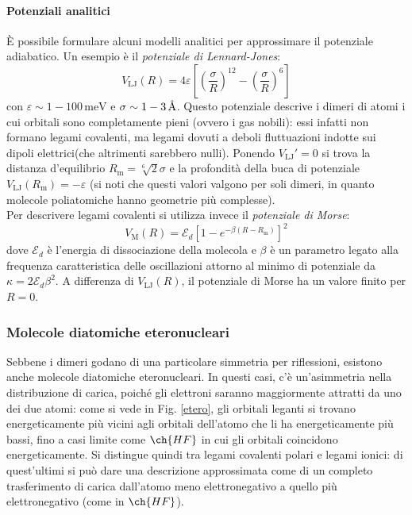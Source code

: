 \paragraph{Potenziali analitici}

È possibile formulare alcuni modelli analitici per approssimare il potenziale adiabatico. Un esempio è il \textit{potenziale di Lennard-Jones}:
\begin{equation}
	V_\text{LJ}(R) = 4 \varepsilon \left[ \left( \frac{\sigma}{R} \right)^{12} - \left( \frac{\sigma}{R} \right)^6 \right]
\end{equation}
con $ \varepsilon \sim 1-100 \,\text{meV} $ e $ \sigma \sim 1-3 \,\text{\AA} $. Questo potenziale descrive i dimeri di atomi i cui orbitali sono completamente pieni (ovvero i gas nobili): essi infatti non formano legami covalenti, ma legami dovuti a deboli fluttuazioni indotte sui dipoli elettrici\footnotemark (che altrimenti sarebbero nulli). Ponendo $ V_\text{LJ}' = 0 $ si trova la distanza d'equilibrio $ R_\text{m} = \sqrt[6]{2} \sigma $ e la profondità della buca di potenziale $ V_\text{LJ}(R_\text{m}) = -\varepsilon $ (si noti che questi valori valgono per soli dimeri, in quanto molecole poliatomiche hanno geometrie più complesse). \\
Per descrivere legami covalenti si utilizza invece il \textit{potenziale di Morse}:
\begin{equation}
	V_\text{M}(R) = \mathcal{E}_d \left[ 1 - e^{-\beta (R - R_\text{m})} \right]^2
\end{equation}
dove $ \mathcal{E}_d $ è l'energia di dissociazione della molecola e $ \beta $ è un parametro legato alla frequenza caratteristica delle oscillazioni attorno al minimo di potenziale da $ \kappa = 2 \mathcal{E}_d \beta^2 $. A differenza di $ V_\text{LJ}(R) $, il potenziale di Morse ha un valore finito per $ R = 0 $.


\subsubsection{Molecole diatomiche eteronucleari}

Sebbene i dimeri godano di una particolare simmetria per riflessioni, esistono anche molecole diatomiche eteronucleari. In questi casi, c'è un'asimmetria nella distribuzione di carica, poiché gli elettroni saranno maggiormente attratti da uno dei due atomi: come si vede in Fig. \ref{etero}, gli orbitali leganti si trovano energeticamente più vicini agli orbitali dell'atomo che li ha energeticamente più bassi, fino a casi limite come $ \ch{HF} $ in cui gli orbitali coincidono energeticamente. Si distingue quindi tra legami covalenti polari e legami ionici: di quest'ultimi si può dare una descrizione approssimata come di un completo trasferimento di carica dall'atomo meno elettronegativo a quello più elettronegativo (come in $ \ch{HF} $).

